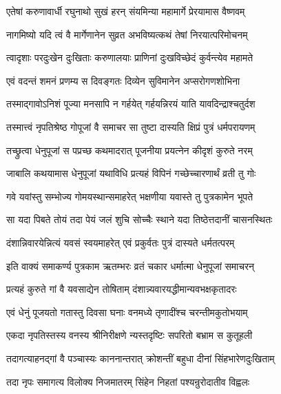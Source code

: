 \twolineshloka
{एतेषां करुणावार्धी रघुनाथो सुखं हरन्}
{संयमिन्या महामार्गे प्रेरयामास वैष्णवम्}%

\twolineshloka
{नागमिष्यो यदि त्वं वै मार्गेणानेन सुव्रत}
{अभविष्यत्कथं तेषां निरयात्परिमोचनम्}%

\twolineshloka
{त्वादृशाः परदुःखेन दुःखिताः करुणालयाः}
{प्राणिनां दुःखविच्छेदं कुर्वन्त्येव महामते}%


\twolineshloka
{एवं वदन्तं शमनं प्रणम्य स दिवङ्गतः}
{दिव्येन सुविमानेन अप्सरोगणशोभिना}%

\twolineshloka
{तस्माद्गावोऽनिशं पूज्या मनसापि न गर्हयेत्}
{गर्हयन्निरयं याति यावदिन्द्राश्चतुर्दश}%

\twolineshloka
{तस्मात्त्वं नृपतिश्रेष्ठ गोपूजां वै समाचर}
{सा तुष्टा दास्यति क्षिप्रं पुत्रं धर्मपरायणम्}%


\twolineshloka
{तच्छ्रुत्वा धेनुपूजां स पप्रच्छ कथमादरात्}
{पूजनीया प्रयत्नेन कीदृशं कुरुते नरम्}%

\twolineshloka
{जाबालि कथयामास धेनुपूजां यथाविधि}
{प्रत्यहं विपिनं गच्छेच्चारणार्थं व्रती तु गोः}%

\twolineshloka
{गवे यवांस्तु सम्भोज्य गोमयस्थान्समाहरेत्}
{भक्षणीया यवास्ते तु पुत्रकामेन भूपते}%

\twolineshloka
{सा यदा पिबते तोयं तदा पेयं जलं शुचि}
{सोच्चैः स्थाने यदा तिष्ठेत्तदानीं चासनस्थितः}%

\twolineshloka
{दंशान्निवारयेन्नित्यं यवसं स्वयमाहरेत्}
{एवं प्रकुर्वतः पुत्रं दास्यते धर्मतत्परम्}%


\twolineshloka
{इति वाक्यं समाकर्ण्य पुत्रकाम ऋतम्भरः}
{व्रतं चकार धर्मात्मा धेनुपूजां समाचरन्}%

\twolineshloka
{प्रत्यहं कुरुते गां वै यवसाद्येन तोषिताम्}
{दंशान्न्यवारयद्धीमान्यवभक्षकृतादरः}%

\twolineshloka
{एवं धेनुं पूजयतो गतास्तु दिवसा घनाः}
{वनमध्ये तृणादींश्च चरन्तीमकुतोभयाम्}%

\twolineshloka
{एकदा नृपतिस्तस्य वनस्य श्रीनिरीक्षणे}
{न्यस्तदृष्टिः सपरितो बभ्राम स कुतूहली}%

\twolineshloka
{तदागत्याहनद्गां वै पञ्चास्यः काननान्तरात्}
{क्रोशन्तीं बहुधा दीनां सिंहभारेणदुःखिताम्}%

\twolineshloka
{तदा नृपः समागत्य विलोक्य निजमातरम्}
{सिंहेन निहतां पश्यन्रुरोदातीव विह्वलः}%

